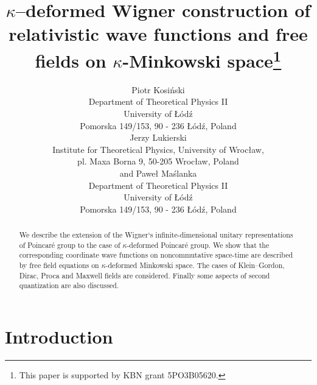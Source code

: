 \documentclass[a4paper,a4paper]{article}
\begin{document}
\title{$\kappa$--deformed Wigner construction of
 relativistic   wave functions and  free fields
 on $\kappa$-Minkowski space\thanks{
This paper is    supported by KBN grant 5PO3B05620.}}

\author{
Piotr Kosi\'nski
\\
Department of Theoretical Physics II \\
University of {\L}\'od\'z \\
Pomorska 149/153, 90 - 236 {\L}\'{o}d\'{z}, Poland
\\
Jerzy Lukierski
\\
Institute for
Theoretical Physics, University of Wroc{\l}aw,\\
pl. Maxa Borna 9, 50-205 Wroc{\l}aw, Poland  
\\
 and Pawe{\l} Ma\'{s}lanka
\\
Department of Theoretical Physics II \\            
University of {\L}\'od\'z \\                        
Pomorska 149/153, 90 - 236 {\L}\'{o}d\'{z}, Poland
}

\date{}		
\maketitle
\begin{abstract}
We describe the extension of the Wigner`s infinite-dimensional
unitary representations of Poincar\'{e} group to the case of
$\kappa$-deformed  Poincar\'{e} group. We show that the
corresponding coordinate wave functions on noncommutative
space-time are described by free field equations on
$\kappa$-deformed Minkowski space.
 The cases of Klein--Gordon, Dirac, Proca and Maxwell fields are considered.
 Finally some aspects of second quantization are also discussed.
\end{abstract}



\section{Introduction}
\end{document}
